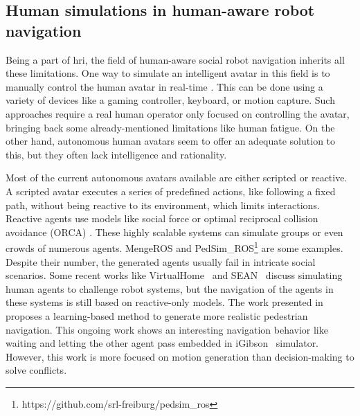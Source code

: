 \subsection{Human simulations in human-aware robot navigation}

Being a part of \acrshort{hri}, the field of human-aware social robot navigation inherits all these limitations. One way to simulate an intelligent avatar in this field is to manually control the human avatar in real-time \cite{echeverria_simulating_2012}. 
This can be done using a variety of devices like a gaming controller, keyboard, or motion capture. Such approaches require a real human operator only focused on controlling the avatar, bringing back some already-mentioned limitations like human fatigue. On the other hand, autonomous human avatars seem to offer an adequate solution to this, but they often lack intelligence and rationality. 

Most of the current autonomous avatars available are either scripted or reactive. A scripted avatar executes a series of predefined actions, like following a fixed path, without being reactive to its environment, which limits interactions. Reactive agents use models like social force \cite{helbing1995social} or optimal reciprocal collision avoidance (ORCA) \cite{van2011reciprocal}. These highly scalable systems can simulate groups or even crowds of numerous agents. MengeROS \cite{aroor_mengeros_2018} and PedSim\_ROS\footnote{https://github.com/srl-freiburg/pedsim\_ros} are some examples. Despite their number, the generated agents usually fail in intricate social scenarios. Some recent works like VirtualHome~\cite{puig_virtualhome_2018} and SEAN~\cite{Tsoi_2020_HAI,tsoi2022sean} discuss simulating human agents to challenge robot systems, but the navigation of the agents in these systems is still based on reactive-only models. 
The work presented in~\cite{social_igibson} proposes a learning-based method to generate more realistic pedestrian navigation. This ongoing work shows an interesting navigation behavior like waiting and letting the other agent pass embedded in iGibson~\cite{shenigibson} simulator. However, this work is more focused on motion generation than decision-making to solve conflicts. 

